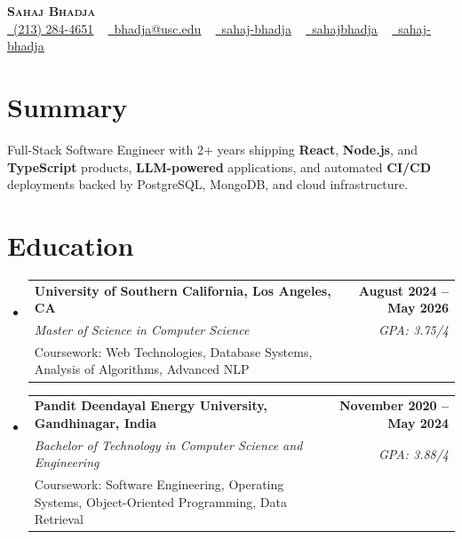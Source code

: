 \documentclass[letterpaper,10pt]{article}
\makeatletter
\newcommand{\sectionGap}{\vspace{-8pt}}
\newcommand{\resumeEduSubheading}[5]{\vspace{-1pt}\item\begin{tabular*}{1.0\textwidth}[t]{l@{\extracolsep{\fill}}r}\textbf{#1} & \textbf{\small #2} \\\textit{\small #3} & \textit{\small #4} \\\small #5 & \\\end{tabular*}\vspace{-4pt}}
\newcommand{\resumeSubHeadingListStart}{\begin{itemize}[leftmargin=0.0in, label={}]}
\newcommand{\resumeSubHeadingListEnd}{\end{itemize}}
\makeatother
\begin{document}
\begin{center}
{\Huge \scshape \textbf{Sahaj Bhadja}} \\ \vspace{1pt}
\small \href{tel:2132844651}{\faPhone\ \underline{(213) 284-4651}} ~ \href{mailto:bhadja@usc.edu}{\raisebox{-0.2\height}\faEnvelope\ \underline{bhadja@usc.edu}} ~
\href{https://www.linkedin.com/in/sahaj-bhadja/}{\raisebox{-0.2\height}\faLinkedin\ \underline{sahaj-bhadja}} ~ \href{https://github.com/SAHAJ-BHADJA}{\raisebox{-0.2\height}\faGithub\ \underline{sahajbhadja}} ~
\href{https://sahaj-bhadja.vercel.app/}{\raisebox{-0.2\height}\faGlobe\ \underline{sahaj-bhadja}}
\end{center}
\vspace{-16pt}
\section{Summary}
\begin{itemize}[leftmargin=0.15in, label={}]
\small{\item{Full-Stack Software Engineer with 2+ years shipping \textbf{React}, \textbf{Node.js}, and \textbf{TypeScript} products, \textbf{LLM-powered} applications, and automated \textbf{CI/CD} deployments backed by PostgreSQL, MongoDB, and cloud infrastructure.}}
\end{itemize}
\sectionGap
\section{Education}
\resumeSubHeadingListStart
\resumeEduSubheading{University of Southern California, Los Angeles, CA}{August 2024 -- May 2026}{Master of Science in Computer Science}{GPA: 3.75/4}{Coursework: Web Technologies, Database Systems, Analysis of Algorithms, Advanced NLP}
\resumeEduSubheading{Pandit Deendayal Energy University, Gandhinagar, India}{November 2020 -- May 2024}{Bachelor of Technology in Computer Science and Engineering}{GPA: 3.88/4}{Coursework: Software Engineering, Operating Systems, Object-Oriented Programming, Data Retrieval}
\resumeSubHeadingListEnd
\sectionGap
\end{document}
